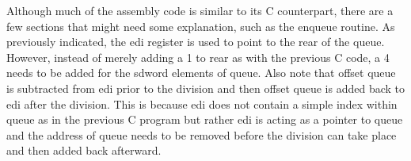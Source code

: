 \documentclass[10pt]{book}
\begin{document}
Although much of the assembly code is similar to its C counterpart, there are a few sections that might need some explanation, such as the enqueue routine. As previously indicated, the edi register is used to point to the rear of the queue. However, instead of merely adding a 1 to rear as with the previous C code, a 4\\
needs to be added for the sdword elements of queue. Also note that offset queue is subtracted from edi prior to the division and then offset queue is added back to edi after the division. This is because edi does not contain a simple index within queue as in the previous C program but rather edi is acting as a pointer to queue and the address of queue needs to be removed before the division can take place and then added back afterward.
\end{document}
